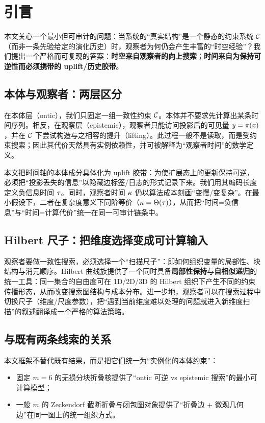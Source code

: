 \section{引言}

本文关心一个最小但可审计的问题：当系统的“真实结构”是一个静态的约束系统 \(\mathcal{C}\)（而非一条先验给定的演化历史）时，观察者为何仍会产生丰富的“时空经验”？我们提出一个严格而可复现的答案：\textbf{时空来自观察者的向上搜索}；\textbf{时间来自为保持可逆性而必须携带的 uplift/历史胶带}。

\subsection{本体与观察者：两层区分}

在本体层（ontic），我们只固定一组一致性约束 \(\mathcal{C}\)。本体并不要求先计算出某条时间序列。相反，在观察层（epistemic），观察者只能访问投影后的可见量 \(y=\pi(x)\)，并在 \(\mathcal{C}\) 下尝试构造与之相容的提升（lifting）。此过程一般不是读取，而是受约束搜索；因此其代价天然具有实例依赖性，并可被解释为“观察者时间”的数学定义。

\begin{remark}[负信息时间与观察者时间]
本文把时间轴的本体成分具体化为 uplift 胶带：为使扩展态上的更新保持可逆，必须把“投影丢失的信息”以隐藏边标签/日志的形式记录下来。我们用其编码长度定义负信息时间 \(\tau\)。同时，观察者时间 \(\kappa\) 仍以算法成本刻画“变慢/变复杂”。在最小假设下，二者在复杂度意义下同阶等价（\(\kappa=\Theta(\tau)\)），从而把“时间=负信息”与“时间=计算代价”统一在同一可审计链条中。
\end{remark}

\subsection{Hilbert 尺子：把维度选择变成可计算输入}

观察者要做一致性搜索，必须选择一个“扫描尺子”：即如何组织变量的局部性、块结构与消元顺序。Hilbert 曲线族提供了一个同时具备\textbf{局部性保持}与\textbf{自相似递归}的统一工具：同一集合的自由度可在 1D/2D/3D 的 Hilbert 组织下产生不同的约束传播形态，从而改变搜索图结构与成本分布。进一步地，观察者可以在搜索过程中切换尺子（维度/尺度参数），把“遇到当前维度难以处理的问题就进入新维度扫描”的叙述翻译成一个严格的算法策略。

\subsection{与既有两条线索的关系}

本文框架不替代既有结果，而是把它们统一为“实例化的本体约束”：
\begin{itemize}
  \item 固定 \(m=6\) 的无损分块折叠核提供了“ontic 可逆 vs epistemic 搜索”的最小可计算模型；
  \item 一般 \(m\) 的 Zeckendorf 截断折叠与闭包图对象提供了“折叠边 + 微观几何边”在同一图上的统一组织方式。
\end{itemize}

